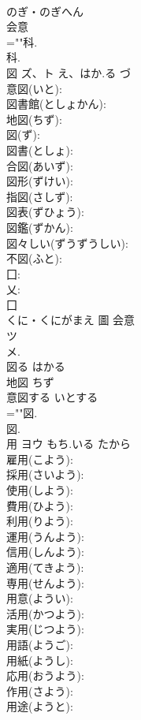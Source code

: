 \documentclass[8pt]{extreport}
\begin{document}
\begin{CJK}{UTF8}{min}
\\	のぎ・のぎへん	
\\	会意 
\\	=""科.
\\	科.
\\	図	ズ、ト	え、はか.る	づ	
\\	意図(いと): 
\\	図書館(としょかん): 
\\	地図(ちず): 
\\	図(ず): 
\\	図書(としょ): 
\\	合図(あいず): 
\\	図形(ずけい): 
\\	指図(さしず): 
\\	図表(ずひょう): 
\\	図鑑(ずかん): 
\\	図々しい(ずうずうしい): 
\\	不図(ふと): 
\\	囗: 
\\	乂: 
\\	囗	
\\	くに・くにがまえ	圖	会意 
\\	ツ 
\\	メ. 
\\	図る はかる 
\\	地図 ちず 
\\	意図する いとする 
\\	=""図.
\\	図.
\\	用	ヨウ	もち.いる	たから	
\\	雇用(こよう): 
\\	採用(さいよう): 
\\	使用(しよう): 
\\	費用(ひよう): 
\\	利用(りよう): 
\\	運用(うんよう): 
\\	信用(しんよう): 
\\	適用(てきよう): 
\\	専用(せんよう): 
\\	用意(ようい): 
\\	活用(かつよう): 
\\	実用(じつよう): 
\\	用語(ようご): 
\\	用紙(ようし): 
\\	応用(おうよう): 
\\	作用(さよう): 
\\	用途(ようと): 

\end{CJK}
\end{document}
